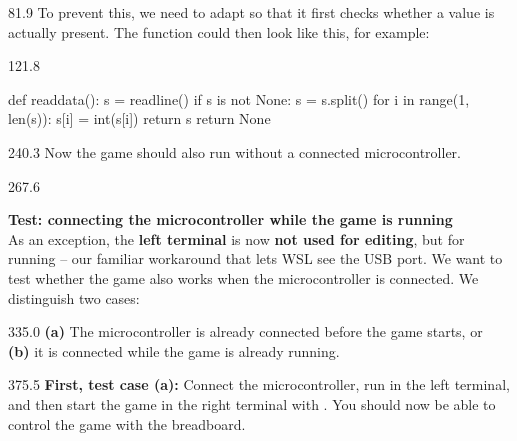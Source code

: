 \documentclass{aslab}
\begin{document}
\nextpage
\begin{region}[x=74.7,right=0,pitch=13.3]{81.9}
To prevent this, we need to adapt  so that it first checks
whether a value is actually present. The function could then look like
this, for example:
\end{region}

\begin{region}[x=74.7,right=0,pitch=13.2]{121.8}
\begin{codeblock}
def readdata():
    s = readline()
    if s is not None:
        s = s.split()
        for i in range(1, len(s)):
            s[i] = int(s[i])
        return s
    return None
\end{codeblock}
\end{region}

\begin{region}[x=74.7,right=0]{240.3}
Now the game should also run without a connected microcontroller.
\end{region}

\begin{region}[pitch=13.4]{267.6}
\begin{tasks}[start=4]
\item \textbf{Test: connecting the microcontroller while the game is
  running}\\
  As an exception, the \textbf{left terminal} is now \textbf{not used for
  editing}, but for running  -- our familiar workaround that
  lets WSL see the USB port. We want to test whether the game also works
  when the microcontroller is connected. We distinguish two cases:
\end{tasks}
\end{region}

\begin{region}[x=74.7,right=0,pitch=13.2]{335.0}
  \textbf{(a)} The microcontroller is already connected before the game
  starts, or\\
  \textbf{(b)} it is connected while the game is already running.
\end{region}

\begin{region}[x=74.7,right=0,pitch=13.4]{375.5}
\textbf{First, test case (a):} Connect the microcontroller, run
 in the left terminal, and then start the game in the right
terminal with . You should now be able to control
the game with the breadboard.
\end{region}
\end{document}
